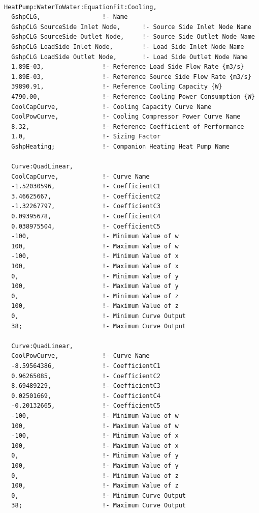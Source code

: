 \begin{lstlisting}

HeatPump:WaterToWater:EquationFit:Cooling,
  GshpCLG,                 !- Name
  GshpCLG SourceSide Inlet Node,      !- Source Side Inlet Node Name
  GshpCLG SourceSide Outlet Node,     !- Source Side Outlet Node Name
  GshpCLG LoadSide Inlet Node,        !- Load Side Inlet Node Name
  GshpCLG LoadSide Outlet Node,       !- Load Side Outlet Node Name
  1.89E-03,                !- Reference Load Side Flow Rate {m3/s}
  1.89E-03,                !- Reference Source Side Flow Rate {m3/s}
  39890.91,                !- Reference Cooling Capacity {W}
  4790.00,                 !- Reference Cooling Power Consumption {W}
  CoolCapCurve,            !- Cooling Capacity Curve Name
  CoolPowCurve,            !- Cooling Compressor Power Curve Name
  8.32,                    !- Reference Coefficient of Performance
  1.0,                     !- Sizing Factor
  GshpHeating;             !- Companion Heating Heat Pump Name

  Curve:QuadLinear,
  CoolCapCurve,            !- Curve Name
  -1.52030596,             !- CoefficientC1
  3.46625667,              !- CoefficientC2
  -1.32267797,             !- CoefficientC3
  0.09395678,              !- CoefficientC4
  0.038975504,             !- CoefficientC5
  -100,                    !- Minimum Value of w
  100,                     !- Maximum Value of w
  -100,                    !- Minimum Value of x
  100,                     !- Maximum Value of x
  0,                       !- Minimum Value of y
  100,                     !- Maximum Value of y
  0,                       !- Minimum Value of z
  100,                     !- Maximum Value of z
  0,                       !- Minimum Curve Output
  38;                      !- Maximum Curve Output

  Curve:QuadLinear,
  CoolPowCurve,            !- Curve Name
  -8.59564386,             !- CoefficientC1
  0.96265085,              !- CoefficientC2
  8.69489229,              !- CoefficientC3
  0.02501669,              !- CoefficientC4
  -0.20132665,             !- CoefficientC5
  -100,                    !- Minimum Value of w
  100,                     !- Maximum Value of w
  -100,                    !- Minimum Value of x
  100,                     !- Maximum Value of x
  0,                       !- Minimum Value of y
  100,                     !- Maximum Value of y
  0,                       !- Minimum Value of z
  100,                     !- Maximum Value of z
  0,                       !- Minimum Curve Output
  38;                      !- Maximum Curve Output
\end{lstlisting}

